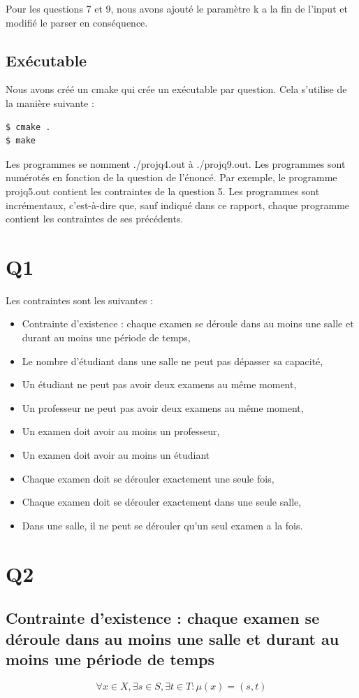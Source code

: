 \documentclass[a4paper,11pt]{article}
\begin{document}
Pour les questions 7 et 9, nous avons ajouté le paramètre k a la fin de l'input et modifié le parser en conséquence.

\subsection{Exécutable}

Nous avons créé un cmake qui crée un exécutable par question.
Cela s'utilise de la manière suivante :
\begin{lstlisting}
$ cmake . 
$ make 
\end{lstlisting}
Les programmes se nomment ./projq4.out à ./projq9.out. Les programmes sont numérotés en fonction de la question de l'énoncé. Par exemple, le programme projq5.out contient les contraintes de la question 5.
Les programmes sont incrémentaux, c'est-à-dire que, sauf indiqué dans ce rapport, chaque programme contient les contraintes de ses précédents.

\section{Q1}
Les contraintes sont les suivantes :
\begin{itemize}
  \item Contrainte d'existence : chaque examen se déroule dans au moins une salle et durant au moins une période de temps,
  \item Le nombre d'étudiant dans une salle ne peut pas dépasser sa capacité,
  \item Un étudiant ne peut pas avoir deux examens au même moment,
  \item Un professeur ne peut pas avoir deux examens au même moment,
  \item Un examen doit avoir au moins un professeur,
  \item Un examen doit avoir au moins un étudiant
  \item Chaque examen doit se dérouler exactement une seule fois,
  \item Chaque examen doit se dérouler exactement dans une seule salle,
  \item Dans une salle, il ne peut se dérouler qu'un seul examen a la fois.
\end{itemize}


\section{Q2}
\subsection{Contrainte d'existence : chaque examen se déroule dans au moins une salle et durant au moins une période de temps}
\begin{displaymath}
	\forall x \in X, \exists s \in S, \exists t \in T : \mu(x) = (s,t) 
\end{displaymath}
\end{document}
